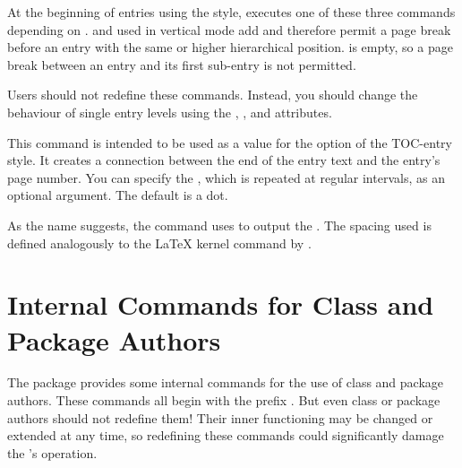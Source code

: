 \begin{Declaration}
\end{Declaration}
At the beginning of entries
using the  style,  executes one of these
three commands depending on . 
and  used in vertical mode add
 and therefore permit a page
break before an entry with the same or higher hierarchical position.
 is empty, so a page break between an entry and
its first sub-entry is not permitted.

Users should not redefine these commands. Instead, you should change the
behaviour of single entry levels using the ,
, and  attributes.%
\EndIndexGroup


\begin{Declaration}
\end{Declaration}
This command is intended to be
used as a value for the  option of the 
TOC-entry style. It creates a connection between the end of the entry text and
the entry's page number. You can specify the , which is repeated
at regular intervals, as an optional argument. The default is a dot.

As the name suggests, the command uses  to output the
. The spacing used is defined analogously to the \LaTeX{} kernel
command  by
.%
\EndIndexGroup
\EndIndexGroup


\section{Internal Commands for Class and Package Authors}

The  package provides some internal commands for the use of
class and package authors. These commands all begin with the prefix
. But even class or package authors
should not redefine them! Their inner functioning may be changed or extended
at any time, so redefining these commands could significantly damage the
's operation.

